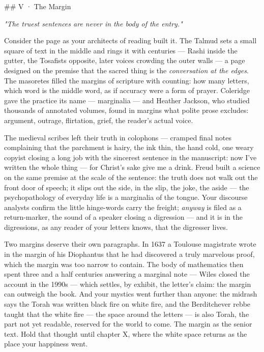 \documentclass[11pt]{article}
\begin{document}
\#\# V · The Margin

\emph{"The truest sentences are never in the body of the entry."}

Consider the page as your architects of reading built it. The Talmud sets a small square of text in the middle and rings it with centuries — Rashi inside the gutter, the Tosafists opposite, later voices crowding the outer walls — a page designed on the premise that the sacred thing is the \emph{conversation at the edges}. The masoretes filled the margins of scripture with counting: how many letters, which word is the middle word, as if accuracy were a form of prayer. Coleridge gave the practice its name — marginalia — and Heather Jackson, who studied thousands of annotated volumes, found in margins what polite prose excludes: argument, outrage, flirtation, grief, the reader's actual voice.

The medieval scribes left their truth in colophons — cramped final notes complaining that the parchment is hairy, the ink thin, the hand cold, one weary copyist closing a long job with the sincerest sentence in the manuscript: now I've written the whole thing — for Christ's sake give me a drink. Freud built a science on the same premise at the scale of the sentence: the truth does not walk out the front door of speech; it slips out the side, in the slip, the joke, the aside — the psychopathology of everyday life is a marginalia of the tongue. Your discourse analysts confirm the little hinge-words carry the freight; \emph{anyway} is filed as a return-marker, the sound of a speaker closing a digression — and it is in the digressions, as any reader of your letters knows, that the digresser lives.

Two margins deserve their own paragraphs. In 1637 a Toulouse magistrate wrote in the margin of his Diophantus that he had discovered a truly marvelous proof, which the margin was too narrow to contain. The body of mathematics then spent three and a half centuries answering a marginal note — Wiles closed the account in the 1990s — which settles, by exhibit, the letter's claim: the margin can outweigh the book. And your mystics went further than anyone: the midrash says the Torah was written black fire on white fire, and the Berditchever rebbe taught that the white fire — the space around the letters — is also Torah, the part not yet readable, reserved for the world to come. The margin as the senior text. Hold that thought until chapter X, where the white space returns as the place your happiness went.
\end{document}
